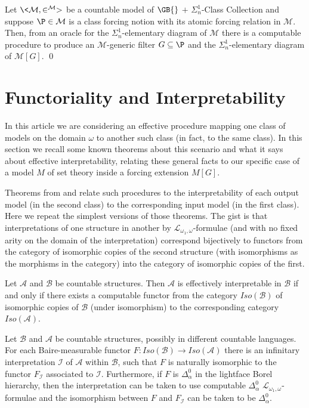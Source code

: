 \documentclass{amsart}
\begin{document}
\begin{corollary}
Let $\<\mathcal{M},\in^{\mathcal{M}}>$ be a countable model of $\GB{}$ $+$ $\Sigma^1_n$-Class Collection and suppose $\P \in \mathcal M$ is a class forcing notion with its atomic forcing relation in $\mathcal M$. Then, from an oracle for the $\Sigma^1_n$-elementary diagram of $\mathcal M$ there is a computable procedure to produce an $\mathcal M$-generic filter $G \subseteq \P$ and the  $\Sigma^1_n$-elementary diagram of $\mathcal{M}[G]$. \qed
\end{corollary}


\section{Functoriality and Interpretability}
\label{sec:functoriality}

In this article we are considering an effective procedure mapping one class of models
on the domain $\omega$ to another such class (in fact, to the same class). In this section we recall some known theorems about this scenario and what it says about effective interpretability, relating these general facts to our specific case of a model $M$ of set theory inside a forcing extension $M[G]$.

Theorems from \cite{HTM3} and \cite{HTM2} relate such procedures
to the interpretability of each output model (in the second class) to the
corresponding input model (in the first class).  Here we repeat
the simplest versions of those theorems.  The gist is that interpretations
of one structure in another by $\mathcal{L}_{\omega_1,\omega}$-formulae
(and with no fixed arity on the domain of the interpretation) correspond bijectively
to functors from the category of isomorphic copies of the second structure
(with isomorphisms as the morphisms in the category)
into the category of isomorphic copies of the first.

\begin{theorem}
\label{thm:HTM3}
Let $\mathcal A$ and $\mathcal B$ be countable structures. Then
$\mathcal A$ is effectively interpretable in $\mathcal B$ if and only if
there exists a computable functor from the category $Iso(\mathcal B)$
of isomorphic copies of $\mathcal B$ (under isomorphism) to the
corresponding category $Iso(\mathcal A)$.
\end{theorem}
\begin{theorem}
\label{thm:HTM2}
Let $\mathcal B$ and $\mathcal A$ be countable structures, possibly in different countable languages.
For each Baire-measurable functor $F:Iso(\mathcal B)\to Iso(\mathcal A)$ there is an
infinitary interpretation $\mathcal I$ of $\mathcal A$ within $\mathcal B$, such that $F$ is naturally isomorphic
to the functor $F_{\mathcal I}$ associated to $\mathcal I$.  Furthermore, if $F$ is $\Delta^0_{\alpha}$
in the lightface Borel hierarchy, then the interpretation can be taken to use
computable $\Delta^0_\alpha$ $\mathcal{L}_{\omega_1,\omega}$-formulae and the isomorphism
between $F$ and $F_{\mathcal I}$ can be taken to be $\Delta^0_\alpha$.
\end{theorem}
\end{document}

